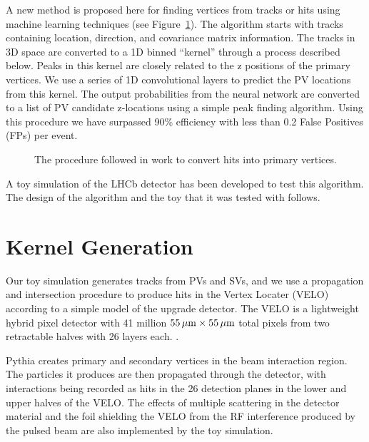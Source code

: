 \documentclass[a4paper]{jpconf}
\begin{document}
A new method is proposed here for finding vertices from tracks or hits using machine learning techniques (see Figure~\ref{fig:approach}). The algorithm starts with tracks containing location, direction, and covariance matrix information. The tracks in 3D space are converted to a 1D binned ``kernel'' through a process described below. Peaks in this kernel are closely related to the z positions of the primary vertices. We use a series of 1D convolutional layers to predict the PV locations from this kernel. The output probabilities from the neural network are converted to a list of PV candidate z-locations using a simple peak finding algorithm. Using this procedure we have surpassed 90\% efficiency with less than 0.2 False Positives (FPs) per event.


\begin{figure}
	\centering
	
	\caption{The procedure followed in work to convert hits into primary vertices.}
	\label{fig:approach}
\end{figure}

A toy simulation of the LHCb detector has been developed to test this algorithm. The design of the algorithm and the toy that it was tested with follows.

\section{Kernel Generation}

Our toy simulation generates tracks from PVs and SVs, and we use a propagation and intersection procedure to produce hits in the Vertex Locater (VELO) according to a simple model of the upgrade detector. The VELO is a lightweight hybrid pixel detector with 41 million $\unit[55]{\mu m} \times \unit[55]{\mu m}$ total pixels from two retractable halves with 26 layers each.  \cite{Collaboration:1624070}.

Pythia \cite{Sjostrand:2006za, Sjostrand:2007gs} creates primary and secondary vertices in the beam interaction region. The particles it produces are then propagated through the detector, with interactions being recorded as hits in the 26 detection planes in the lower and upper halves of the VELO. The effects of multiple scattering in the detector material and the foil shielding the VELO from the RF interference produced by the pulsed beam \cite{Collaboration:1624070} are also implemented by the toy simulation.
\end{document}

